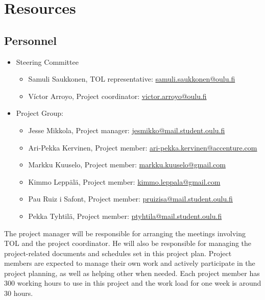 \documentclass[12pt,titlepage]{article}
\begin{document}
\section{Resources}
	\subsection{Personnel}
		\begin{itemize}
		\item Steering Committee
			\begin{itemize}
				\item Samuli Saukkonen, TOL representative:  \href{mailto:samuli.saukkonen@oulu.fi}{samuli.saukkonen@oulu.fi}
				\item Víctor Arroyo, Project coordinator: \href{mailto:victor.arroyo@oulu.fi}{victor.arroyo@oulu.fi}
			\end{itemize}
		
		\item Project Group:
			\begin{itemize}
				\item Jesse Mikkola, Project manager: \href{mailto:jesmikko@mail.student.oulu.fi}{jesmikko@mail.student.oulu.fi}
				\item Ari-Pekka Kervinen, Project member: \href{mailto:ari-pekka.kervinen@accenture.com}{ari-pekka.kervinen@accenture.com}
				\item Markku Kuuselo, Project member: \href{mailto:markku.kuuselo@gmail.com}{markku.kuuselo@gmail.com}
				\item Kimmo Leppälä, Project member: \href{mailto:kimmo.leppala@gmail.com}{kimmo.leppala@gmail.com}
				\item Pau Ruiz i Safont, Project member: \href{mailto:pruizisa@mail.student.oulu.fi}{pruizisa@mail.student.oulu.fi}
				\item Pekka Tyhtilä, Project member: \href{mailto:ptyhtila@mail.student.oulu.fi}{ptyhtila@mail.student.oulu.fi}
			\end{itemize}
		\end{itemize}
		
		The project manager will be responsible for arranging the meetings involving TOL and the project coordinator.
		He will also be responsible for managing the project-related documents and schedules set in this project plan.
		Project members are expected to manage their own work and actively participate in the project planning, as well as helping other when needed.
		Each project member has 300 working hours to use in this project and the work load for one week is around 30 hours.
\end{document}
